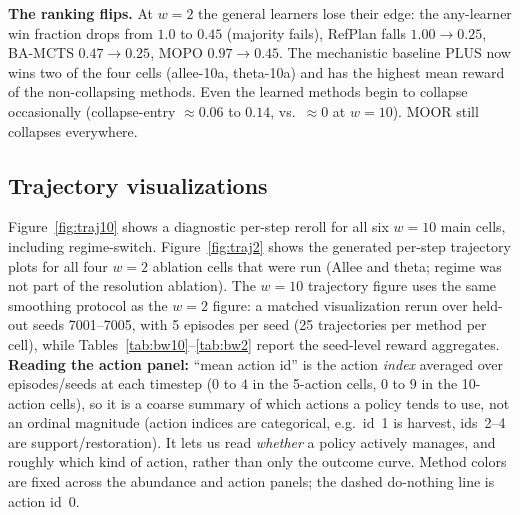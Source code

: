 \documentclass[11pt]{article}
\begin{document}
\noindent\textbf{The ranking flips.} At $w=2$ the general learners lose their edge: the
any-learner win fraction drops from $1.0$ to $0.45$ (majority fails), RefPlan falls
$1.00\to0.25$, BA-MCTS $0.47\to0.25$, MOPO $0.97\to0.45$. The mechanistic baseline PLUS
now wins two of the four cells (allee-10a, theta-10a) and has the highest mean reward of
the non-collapsing methods. Even the learned methods begin to collapse occasionally
(collapse-entry $\approx 0.06$ to $0.14$, vs.\ $\approx 0$ at $w=10$). MOOR still collapses
everywhere.

\subsection{Trajectory visualizations}
Figure~\ref{fig:traj10} shows a diagnostic per-step reroll for all six $w=10$ main cells,
including regime-switch. Figure~\ref{fig:traj2} shows the generated per-step trajectory
plots for all four $w=2$ ablation cells that were run (Allee and theta; regime was not
part of the resolution ablation). The $w=10$ trajectory figure uses the same smoothing
protocol as the $w=2$ figure: a matched visualization rerun over held-out seeds
7001--7005, with 5 episodes per seed (25 trajectories per method per cell), while
Tables~\ref{tab:bw10}--\ref{tab:bw2} report the seed-level reward aggregates.
\textbf{Reading the action panel:} ``mean action id'' is the
action
\emph{index} averaged over episodes/seeds at each timestep ($0$ to $4$ in the 5-action
cells, $0$ to $9$ in the 10-action cells), so it is a coarse summary of which actions a
policy tends to use, not an ordinal magnitude (action indices are categorical, e.g.\ id~1
is harvest, ids~2--4 are support/restoration). It lets us read \emph{whether} a policy
actively manages, and roughly which kind of action, rather than only the outcome curve.
Method colors are fixed across the abundance and action panels; the dashed do-nothing
line is action id~0.
\end{document}
